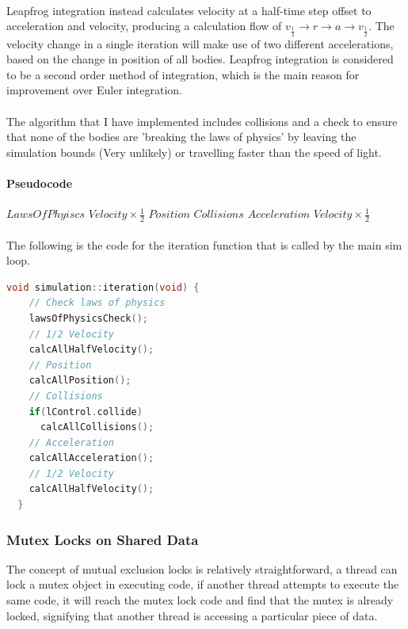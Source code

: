 \paragraph{}
Leapfrog integration instead calculates velocity at a half-time step offset to acceleration and velocity, producing a calculation flow of $v_\frac{1}{2}\rightarrow r\rightarrow a\rightarrow v_\frac{1}{2}$. The velocity change in a single iteration will make use of two different accelerations, based on the change in position of all bodies. Leapfrog integration is considered to be a second order method of integration, which is the main reason for improvement over Euler integration.

\paragraph{}
The algorithm that I have implemented includes collisions and a check to ensure that none of the bodies are 'breaking the laws of physics' by leaving the simulation bounds (Very unlikely) or travelling faster than the speed of light.

\paragraph{Pseudocode}
\begin{algorithmic}[1]
\STATE $LawsOfPhyiscs$
\STATE $Velocity \times \frac{1}{2}$
\STATE $Position$
  \STATE $Collisions$
\ENDIF
\STATE $Acceleration$
\STATE $Velocity \times \frac{1}{2}$
\end{algorithmic}

\paragraph{}
The following is the code for the iteration function that is called by the main sim loop.
\begin{lstlisting}[language=c++]
  void simulation::iteration(void) {
    // Check laws of physics
    lawsOfPhysicsCheck();
    // 1/2 Velocity
    calcAllHalfVelocity();
    // Position
    calcAllPosition();
    // Collisions
    if(lControl.collide)
      calcAllCollisions();
    // Acceleration
    calcAllAcceleration();
    // 1/2 Velocity
    calcAllHalfVelocity();
  }
\end{lstlisting}

\pagebreak

\subsubsection{Mutex Locks on Shared Data}
The concept of mutual exclusion locks is relatively straightforward, a thread can lock a mutex object in executing code, if another thread attempts to execute the same code, it will reach the mutex lock code and find that the mutex is already locked, signifying that another thread is accessing a particular piece of data.

